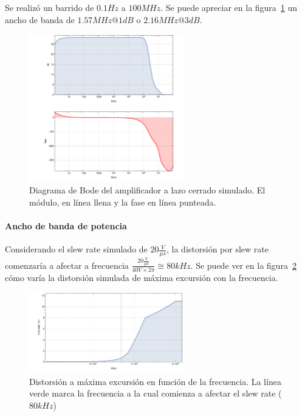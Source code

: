 \documentclass[a4paper,12pt,twoside]{article}
\begin{document}
Se realizó un barrido de $0.1Hz$ a $100MHz$. Se puede apreciar en la figura~\ref{fig:bode} un ancho de banda de $1.57MHz@1dB$ o $2.16MHz@3dB$.

\begin{figure}[H]
	\centering
	\includegraphics[width=0.6\textwidth]{img/sim/bode}
	\caption{Diagrama de Bode del amplificador a lazo cerrado simulado. El módulo, en línea llena y la fase en línea punteada.}
	\label{fig:bode}
\end{figure}



\paragraph{Ancho de banda de potencia}

Considerando el slew rate simulado de $20\frac{V}{\mu s}$, la distorsión por slew rate comenzaría a afectar a frecuencia $\frac{20\frac{V}{\mu s}}{40V \times 2\pi}\cong 80kHz$. Se puede ver en la figura~\ref{fig:distorsion-frec} cómo varía la distorsión simulada de máxima excursión con la frecuencia.


\begin{figure}[H]
	\centering
	\includegraphics[width=0.6\textwidth]{img/sim/distorsion-frec}
	\caption{Distorsión a máxima excursión en función de la frecuencia. La línea verde marca la frecuencia a la cual comienza a afectar el slew rate ($80kHz$)}
	\label{fig:distorsion-frec}
\end{figure}
\end{document}
